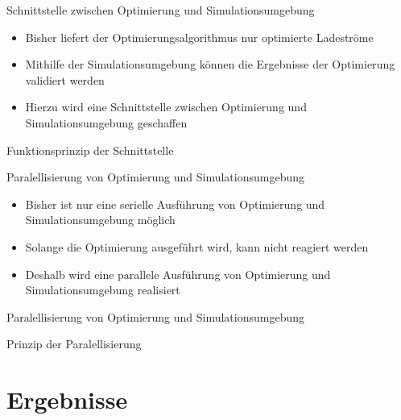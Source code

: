 \documentclass[aspectratio=169]{beamer}
\begin{document}
\begin{frame}{Schnittstelle zwischen Optimierung und Simulationsumgebung}
	\begin{itemize}
		\item Bisher liefert der Optimierungsalgorithmus nur optimierte
		Ladeströme
		\item Mithilfe der Simulationsumgebung können die Ergebnisse
		der Optimierung validiert werden
		\item Hierzu wird eine Schnittstelle zwischen Optimierung und
		Simulationsumgebung geschaffen
	\end{itemize}
\end{frame}


\begin{frame}{Funktionsprinzip der Schnittstelle}
	\begin{figure}
		\centering
		
	\end{figure}
\end{frame}


\begin{frame}{Paralellisierung von Optimierung und Simulationsumgebung}
	\begin{itemize}
		\item Bisher ist nur eine serielle Ausführung von Optimierung und
		Simulationsumgebung möglich
		\item Solange die Optimierung ausgeführt wird, kann nicht reagiert 
		werden
		\item Deshalb wird eine parallele Ausführung von Optimierung und
		Simulationsumgebung realisiert
	\end{itemize}
\end{frame}


\begin{frame}{Paralellisierung von Optimierung und Simulationsumgebung}
	\begin{figure}
		\centering
		
	\end{figure}
\end{frame}


\begin{frame}{Prinzip der Paralellisierung}
	\begin{figure}
		\centering
		
	\end{figure}
\end{frame}


\section{Ergebnisse}
\end{document}
